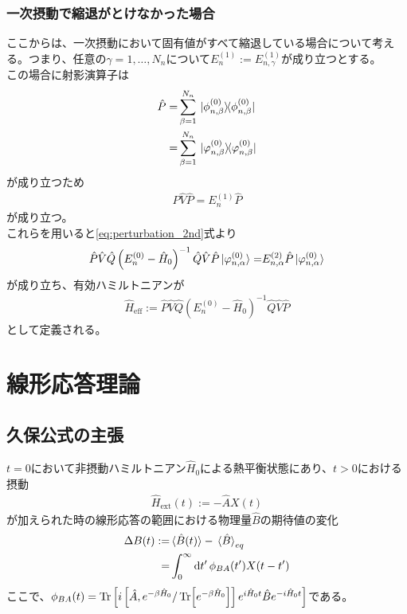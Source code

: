 \documentclass{ltjsarticle}
\begin{document}
\subsubsection{一次摂動で縮退がとけなかった場合}
ここからは、一次摂動において固有値がすべて縮退している場合について考える。つまり、任意の$\gamma=1,\dots,N_n$について$E_n^{(1)}:=E_{n,\gamma}^{(1)}$が成り立つとする。\\
この場合に射影演算子は
\begin{align}
  \hat{P}=&\sum_{\beta=1}^{N_n}\ketbra*{\phi^{(0)}_{n,\beta}}{\phi^{(0)}_{n,\beta}}\\
  =&\sum_{\beta=1}^{N_n}\ketbra*{\varphi^{(0)}_{n,\beta}}{\varphi^{(0)}_{n,\beta}}\\
\end{align}
が成り立つため
\begin{align}
  \hat{P}\hat{V}\hat{P}=E_n^{(1)}\hat{P}
\end{align}
が成り立つ。\\
これらを用いると\eqref{eq:perturbation_2nd}式より
\begin{align}
  \hat{P}\hat{V}\hat{Q}\left( E_n^{(0)}-\hat{H}_0 \right)^{-1}\hat{Q}\hat{V}\hat{P}\ket*{\varphi^{(0)}_{n,\alpha}}=&E^{(2)}_{n,\alpha}\hat{P}\ket*{\varphi^{(0)}_{n,\alpha}}\\
\end{align}
が成り立ち、有効ハミルトニアンが
\begin{align}
  \hat{H}_{\text{eff}}:=\hat{P}\hat{V}\hat{Q}\left( E_n^{(0)}-\hat{H}_0 \right)^{-1}\hat{Q}\hat{V}\hat{P}
\end{align}
として定義される。
\section{線形応答理論}
\subsection{久保公式の主張}
$t=0$において非摂動ハミルトニアン$\hat{H}_0$による熱平衡状態にあり、$t>0$における摂動
\begin{align}
  \hat{H}_{\textrm{ext}}(t):=-\hat{A}X(t)
\end{align}
が加えられた時の線形応答の範囲における物理量$\hat{B}$の期待値の変化\\
\begin{align}
  \Delta B(t):=&\ev*{\hat{B}(t)}-\ev*{\hat{B}}_{eq}\\
  =&\int^\infty_0\dd{t'}\phi_{BA}(t')X(t-t')\\
\end{align}
ここで、$\phi_{BA}(t)=\Tr\left[i\left[\hat{A},e^{-\beta \hat{H}_0}/\Tr[e^{-\beta\hat{H}_0}]\right]e^{i\hat{H}_0 t}\hat{B}e^{-i\hat{H}_0 t}\right]$である。\\
\end{document}
